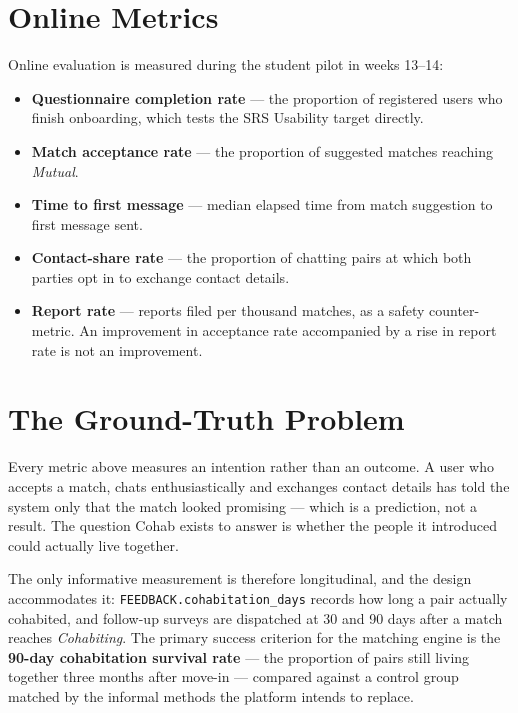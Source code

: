 \documentclass[12pt,a4paper]{report}
\begin{document}
\section{Online Metrics}

Online evaluation is measured during the student pilot in weeks 13--14:

\begin{itemize}[noitemsep]
    \item \textbf{Questionnaire completion rate} --- the proportion of registered users who finish onboarding, which tests the SRS Usability target directly.
    \item \textbf{Match acceptance rate} --- the proportion of suggested matches reaching \emph{Mutual}.
    \item \textbf{Time to first message} --- median elapsed time from match suggestion to first message sent.
    \item \textbf{Contact-share rate} --- the proportion of chatting pairs at which both parties opt in to exchange contact details.
    \item \textbf{Report rate} --- reports filed per thousand matches, as a safety counter-metric. An improvement in acceptance rate accompanied by a rise in report rate is not an improvement.
\end{itemize}

\section{The Ground-Truth Problem}

Every metric above measures an intention rather than an outcome. A user who accepts a match, chats enthusiastically and exchanges contact details has told the system only that the match looked promising --- which is a prediction, not a result. The question Cohab exists to answer is whether the people it introduced could actually live together.

The only informative measurement is therefore longitudinal, and the design accommodates it: \texttt{FEEDBACK.cohabitation\_days} records how long a pair actually cohabited, and follow-up surveys are dispatched at 30 and 90 days after a match reaches \emph{Cohabiting}. The primary success criterion for the matching engine is the \textbf{90-day cohabitation survival rate} --- the proportion of pairs still living together three months after move-in --- compared against a control group matched by the informal methods the platform intends to replace.
\end{document}
